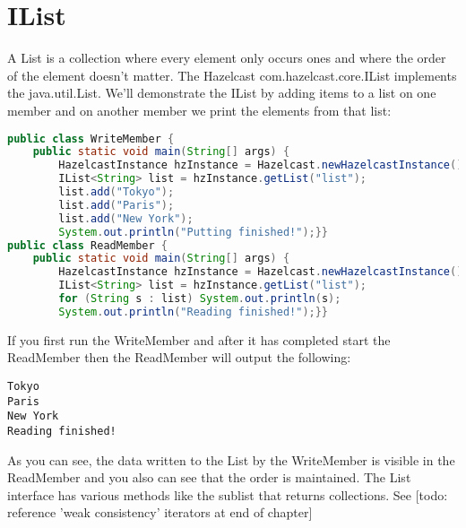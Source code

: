 \section{IList}
A List is a collection where every element only occurs ones and where the order of the element doesn't matter. The Hazelcast com.hazelcast.core.IList implements the java.util.List. We'll demonstrate the IList by adding items to a list on one member and on another member we print the elements from that list:
\begin{lstlisting}[language=java]
public class WriteMember {
    public static void main(String[] args) {
        HazelcastInstance hzInstance = Hazelcast.newHazelcastInstance();
        IList<String> list = hzInstance.getList("list");
        list.add("Tokyo");
        list.add("Paris");
        list.add("New York");
        System.out.println("Putting finished!");}}
public class ReadMember {
    public static void main(String[] args) {
        HazelcastInstance hzInstance = Hazelcast.newHazelcastInstance();
        IList<String> list = hzInstance.getList("list");
        for (String s : list) System.out.println(s);
        System.out.println("Reading finished!");}}
\end{lstlisting}
If you first run the WriteMember and after it has completed start the ReadMember then the ReadMember will output the following:
\begin{lstlisting}
Tokyo
Paris
New York
Reading finished!
\end{lstlisting}
As you can see, the data written to the List by the WriteMember is visible in the ReadMember and you also can see that the order is maintained. The List interface has various methods like the sublist that returns collections. See [todo: reference 'weak consistency' iterators at end of chapter]

